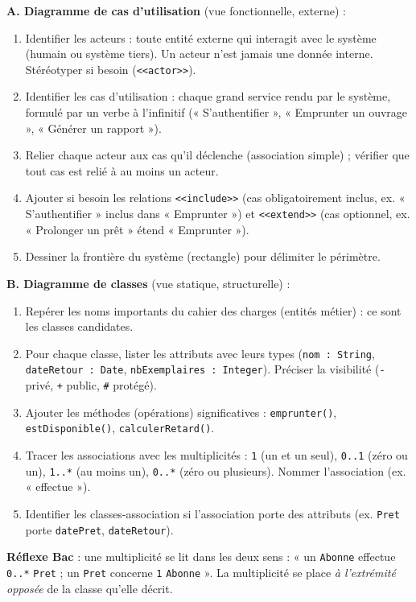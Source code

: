 \documentclass[11pt]{article}
\newcommand{\cle}[1]{{\popxbold\color{popdark}#1}}
\begin{document}
\begin{methode}
\textbf{A. Diagramme de cas d'utilisation} (vue fonctionnelle, externe) :
\begin{enumerate}
\item Identifier les \cle{acteurs} : toute entité externe qui interagit avec le système (humain ou système tiers). Un acteur n'est jamais une donnée interne. Stéréotyper si besoin (\texttt{<<actor>>}).
\item Identifier les \cle{cas d'utilisation} : chaque grand service rendu par le système, formulé par un verbe à l'infinitif (« S'authentifier », « Emprunter un ouvrage », « Générer un rapport »).
\item Relier chaque acteur aux cas qu'il déclenche (association simple) ; vérifier que tout cas est relié à au moins un acteur.
\item Ajouter si besoin les relations \texttt{<<include>>} (cas obligatoirement inclus, ex. « S'authentifier » inclus dans « Emprunter ») et \texttt{<<extend>>} (cas optionnel, ex. « Prolonger un prêt » étend « Emprunter »).
\item Dessiner la frontière du système (rectangle) pour délimiter le périmètre.
\end{enumerate}
\textbf{B. Diagramme de classes} (vue statique, structurelle) :
\begin{enumerate}
\item Repérer les noms importants du cahier des charges (entités métier) : ce sont les classes candidates.
\item Pour chaque classe, lister les \cle{attributs} avec leurs types (\texttt{nom : String}, \texttt{dateRetour : Date}, \texttt{nbExemplaires : Integer}). Préciser la visibilité (\texttt{-} privé, \texttt{+} public, \texttt{\#} protégé).
\item Ajouter les \cle{méthodes} (opérations) significatives : \texttt{emprunter()}, \texttt{estDisponible()}, \texttt{calculerRetard()}.
\item Tracer les associations avec les \cle{multiplicités} : \texttt{1} (un et un seul), \texttt{0..1} (zéro ou un), \texttt{1..*} (au moins un), \texttt{0..*} (zéro ou plusieurs). Nommer l'association (ex. « effectue »).
\item Identifier les classes-association si l'association porte des attributs (ex. \texttt{Pret} porte \texttt{datePret}, \texttt{dateRetour}).
\end{enumerate}
\textbf{Réflexe Bac} : une multiplicité se lit dans les deux sens : « un \texttt{Abonne} effectue \texttt{0..*} \texttt{Pret} ; un \texttt{Pret} concerne \texttt{1} \texttt{Abonne} ». La multiplicité se place \emph{à l'extrémité opposée} de la classe qu'elle décrit.
\end{methode}
\end{document}

